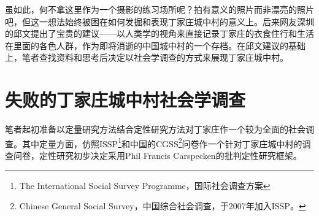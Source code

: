   虽如此，何不拿这里作为一个摄影的练习场所呢？拍有意义的照片而非漂亮的照片吧，但这一想法始终被困在如何发掘和表现丁家庄城中村的意义上。后来网友深圳的邱文提出了宝贵的建议——以人类学的视角来直接记录丁家庄的衣食住行和生活在里面的各色人群，作为即将消逝的中国城中村的一个存档。在邱文建议的基础上，笔者查找资料和思考后决定以社会学调查的方式来展现丁家庄城中村。

  \section{失败的丁家庄城中村社会学调查}

  笔者起初准备以定量研究方法结合定性研究方法对丁家庄作一个较为全面的社会调查。其中定量方面，仿照ISSP\footnote{The International Social Survey Programme，国际社会调查方案}和中国的CGSS\footnote{Chinese General Social Survey，中国综合社会调查，于2007年加入ISSP。}问卷作一个针对丁家庄城中村的调查问卷，定性研究初步决定采用Phil Francis Carspecken的批判定性研究框架。

